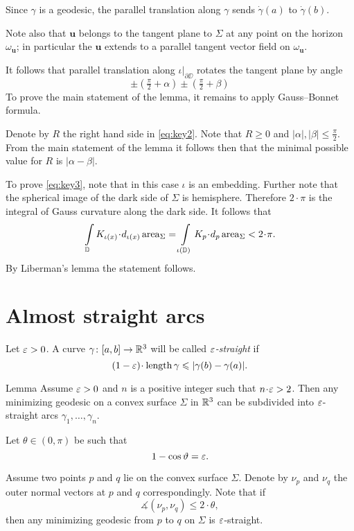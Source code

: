 \documentclass[a4paper,10pt]{article}
\begin{document}
Since $\gamma$ is a geodesic, 
the parallel translation along $\gamma$ 
sends $\dot\gamma(a)$ to $\dot\gamma(b)$.

Note also that $\bm{u}$ belongs to the tangent plane to $\Sigma$ at any point on the horizon $\omega_{\bm{u}}$;
in particular the $\bm{u}$ extends to a parallel tangent vector field on $\omega_{\bm{u}}$.

It follows that parallel translation along $\iota|_{\partial\DD}$ 
rotates the tangent plane by angle 
\[\pm(\tfrac\pi2+\alpha)\pm(\tfrac\pi2+\beta)\]
To prove the main statement of the lemma,
it remains to apply Gauss--Bonnet formula.

Denote by $R$ the right hand side in \ref{eq:key2}.
Note that $R\ge 0$ 
and $|\alpha|,|\beta|\le \tfrac\pi2$.
From the main statement of the lemma it follows then that the minimal possible value for $R$ is $\bigl|\alpha-\beta\bigr|$.

To prove \ref{eq:key3}, note that 
in this case $\iota$ is an embedding.
Further note that the spherical image of the dark side of $\Sigma$ is hemisphere.
Therefore $2\cdot\pi$ is the integral of Gauss curvature along the dark side.
It follows that
\[\int\limits_{\DD} K_{\iota(x)}\cdot d_{\iota(x)}\area_\Sigma
=
\int\limits_{\iota(\DD)} K_p\cdot d_p\area_\Sigma
<2\cdot\pi.\]
By Liberman's lemma the statement follows.
\qeds

\section{Almost straight arcs}

Let $\varepsilon>0$.
A curve $\gamma\colon[a,b]\to\mathbb{R}^3$ will be called \emph{$\varepsilon$-straight}
if 
\[(1-\eps)\cdot\length \gamma\le |\gamma(b)-\gamma(a)|.\]

\begin{thm}{Lemma}\label{lem:eps-straight}
Assume $\varepsilon>0$ 
and $n$ is a positive integer such that
$n\cdot\eps>2$.
Then any minimizing geodesic
on a convex surface $\Sigma$ in $\mathbb{R}^3$
can be subdivided 
into $\varepsilon$-straight arcs $\gamma_1,\dots,\gamma_n$.
\end{thm}

Let $\theta\in(0,\pi)$
be such that 
\[1-\cos\vartheta=\varepsilon.\]

Assume two points $p$ and $q$ lie on the convex surface $\Sigma$.
Denote by $\nu_p$ and $\nu_q$ the outer normal vectors at $p$ and $q$ correspondingly.
Note that if 
\[\measuredangle(\nu_p,\nu_q)\le 2\cdot\theta,\]
then any minimizing geodesic from $p$ to $q$ on $\Sigma$
is $\varepsilon$-straight.
\end{document}

